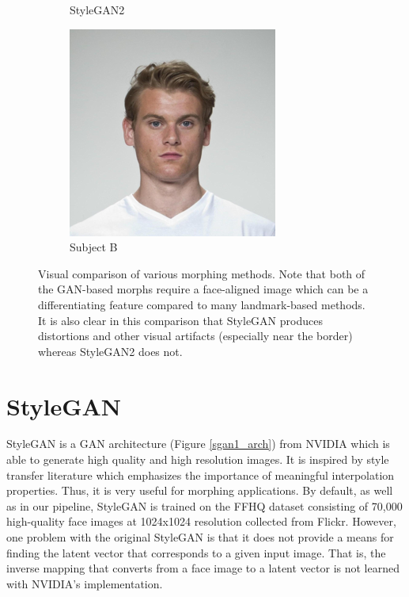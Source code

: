 \documentclass[12pt,twocolumn]{paper}
\begin{document}
\begin{figure}[t]
\begin{subfigure}{0.19\textwidth}
        \caption{StyleGAN2}
        \label{morph_comp_4}
    \end{subfigure}
    \begin{subfigure}{0.19\textwidth}
        \centering
        \includegraphics[width=\textwidth]{morph_example_B.png}
        \caption{Subject B}
        \label{morph_comp_5}
    \end{subfigure}
    \caption{Visual comparison of various morphing methods. Note that both of the GAN-based morphs require a face-aligned image which can be a differentiating feature compared to many landmark-based methods. It is also clear in this comparison that StyleGAN produces distortions and other visual artifacts (especially near the border) whereas StyleGAN2 does not.}
    \label{morph_comp}
\end{figure}

\section{StyleGAN}
\par
StyleGAN \cite{stylegan} is a GAN architecture (Figure \ref{sgan1_arch}) from NVIDIA which is able to generate high quality and high resolution images. It is inspired by style transfer literature which emphasizes the importance of meaningful interpolation properties. Thus, it is very useful for morphing applications. By default, as well as in our pipeline, StyleGAN is trained on the FFHQ dataset consisting of 70,000 high-quality face images at 1024x1024 resolution collected from Flickr. However, one problem with the original StyleGAN is that it does not provide a means for finding the latent vector that corresponds to a given input image. That is, the inverse mapping that converts from a face image to a latent vector is not learned with NVIDIA's implementation.
\end{document}
